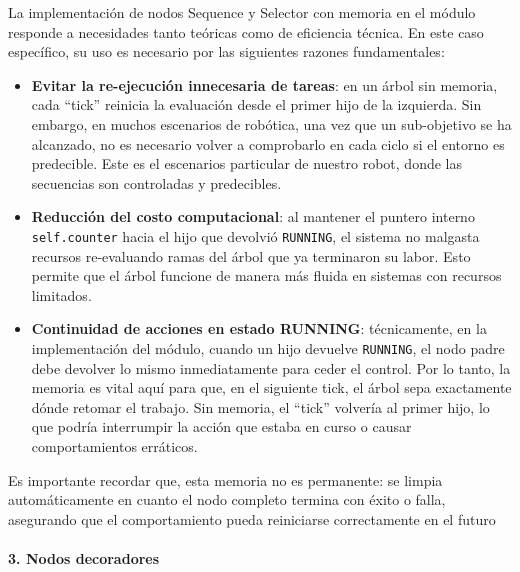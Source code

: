 \documentclass{prgrado}
\begin{document}
La implementación de nodos Sequence y Selector con memoria en el módulo responde a necesidades tanto teóricas como de eficiencia técnica. En este caso específico, su uso es necesario por las siguientes razones fundamentales:

\begin{itemize}
    \item \textbf{Evitar la re-ejecución innecesaria de tareas}: en un árbol sin memoria, cada ``tick'' reinicia la evaluación desde el primer hijo de la izquierda. Sin embargo, en muchos escenarios de robótica, una vez que un sub-objetivo se ha alcanzado, no es necesario volver a comprobarlo en cada ciclo si el entorno es predecible. Este es el escenarios particular de nuestro robot, donde las secuencias son controladas y predecibles.
   
    \item \textbf{Reducción del costo computacional}: al mantener el puntero interno \texttt{self.counter} hacia el hijo que devolvió \texttt{RUNNING}, el sistema no malgasta recursos re-evaluando ramas del árbol que ya terminaron su labor. Esto permite que el árbol funcione de manera más fluida en sistemas con recursos limitados.
   
    \item \textbf{Continuidad de acciones en estado RUNNING}: técnicamente, en la implementación del módulo, cuando un hijo devuelve \texttt{RUNNING}, el nodo padre debe devolver lo mismo inmediatamente para ceder el control. Por lo tanto, la memoria es vital aquí para que, en el siguiente tick, el árbol sepa exactamente dónde retomar el trabajo. Sin memoria, el ``tick'' volvería al primer hijo, lo que podría interrumpir la acción que estaba en curso o causar comportamientos erráticos.
\end{itemize}

Es importante recordar que, esta memoria no es permanente: se limpia automáticamente en cuanto el nodo completo termina con éxito o falla, asegurando que el comportamiento pueda reiniciarse correctamente en el futuro

\paragraph{3. Nodos decoradores}
\end{document}
